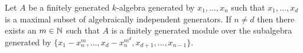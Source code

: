 \begin{lem}[4.13]
  Let $A$ be a finitely generated $k$-algebra generated by $x_1,\ldots,x_n$ such that $x_1,\ldots,x_d$ is a maximal subset of algebraically independent generators.
  If $n \neq d$ then there exists an $m \in \mathbb{N}$ such that $A$ is a finitely generated module over the subalgebra generated by $\{x_1-x_n^m,\ldots,x_d-x_n^{m^d},x_{d+1},\ldots,x_{n-1}\}$.
\end{lem}
